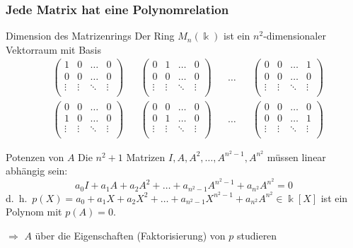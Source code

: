 %
%
%
\begin{frame}[t]
\frametitle{Jede Matrix hat eine Polynomrelation}
\setlength{\abovedisplayskip}{5pt}
\setlength{\belowdisplayskip}{5pt}
\vspace{-5pt}
\begin{block}{Dimension des Matrizenrings}
Der Ring $M_{n}(\Bbbk)$ ist ein $n^2$-dimensionaler Vektorraum mit
Basis
{\tiny
\begin{align*}
&\begin{pmatrix}
1&0&\dots&0\\
0&0&\dots&0\\
\vdots&\vdots&\ddots&\vdots\\
\end{pmatrix}
&
&\begin{pmatrix}
0&1&\dots&0\\
0&0&\dots&0\\
\vdots&\vdots&\ddots&\vdots\\
\end{pmatrix}
&
&\dots
&
&\begin{pmatrix}
0&0&\dots&1\\
0&0&\dots&0\\
\vdots&\vdots&\ddots&\vdots\\
\end{pmatrix}
\\
&\begin{pmatrix}
0&0&\dots&0\\
1&0&\dots&0\\
\vdots&\vdots&\ddots&\vdots\\
\end{pmatrix}
&
&\begin{pmatrix}
0&0&\dots&0\\
0&1&\dots&0\\
\vdots&\vdots&\ddots&\vdots\\
\end{pmatrix}
&
&\dots
&
&\begin{pmatrix}
0&0&\dots&0\\
0&0&\dots&1\\
\vdots&\vdots&\ddots&\vdots\\
\end{pmatrix}
\end{align*}}
\end{block}
\vspace{-10pt}
\begin{block}{Potenzen von $A$}
Die $n^2+1$ Matrizen $I,A,A^2,\dots,A^{n^2-1},A^{n^2}$ müssen linear abhängig
sein:
\[
a_0I+a_1A+a_2A^2+\dots+a_{n^2-1}A^{n^2-1}+a_{n^2}A^{n^2} = 0
\]
d.~h.~$p(X) = a_0+a_1X+a_2X^2+\dots +a_{n^2-1}X^{n^2-1}+a_{n^2}A^{n^2}\in\Bbbk[X]$ ist ein Polynom mit $p(A)=0$.
\end{block}
$\Rightarrow$ $A$ über die Eigenschaften (Faktorisierung) von $p$ studieren
\end{frame}
